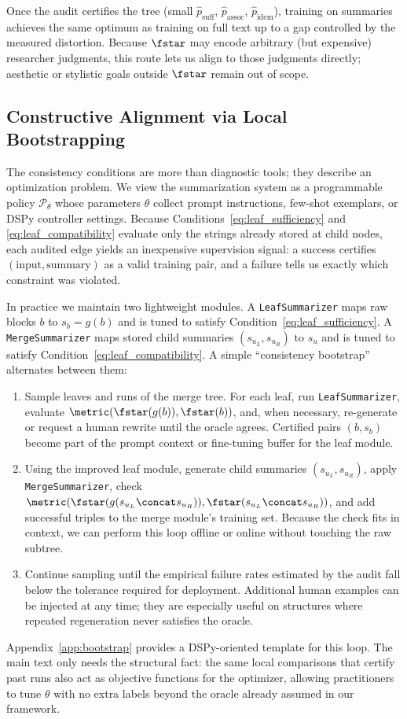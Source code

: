 Once the audit certifies the tree (small $\hat{p}_{\text{suff}}$, $\hat{p}_{\text{assoc}}$, $\hat{p}_{\text{idem}}$), training on summaries achieves the same optimum as training on full text up to a gap controlled by the measured distortion. Because $\fstar$ may encode arbitrary (but expensive) researcher judgments, this route lets us align to those judgments directly; aesthetic or stylistic goals outside $\fstar$ remain out of scope.

\subsection{Constructive Alignment via Local Bootstrapping}\label{sec:bootstrap-main}

The consistency conditions are more than diagnostic tools; they describe an optimization problem. We view the summarization system as a programmable policy $\mathcal{P}_\theta$ whose parameters $\theta$ collect prompt instructions, few-shot exemplars, or DSPy controller settings. Because Conditions~\eqref{eq:leaf_sufficiency} and \eqref{eq:leaf_compatibility} evaluate only the strings already stored at child nodes, each audited edge yields an inexpensive supervision signal: a success certifies $(\text{input}, \text{summary})$ as a valid training pair, and a failure tells us exactly which constraint was violated.

In practice we maintain two lightweight modules. A \texttt{LeafSummarizer} maps raw blocks $b$ to $s_b = g(b)$ and is tuned to satisfy Condition~\eqref{eq:leaf_sufficiency}. A \texttt{MergeSummarizer} maps stored child summaries $(s_{u_L}, s_{u_R})$ to $s_u$ and is tuned to satisfy Condition~\eqref{eq:leaf_compatibility}. A simple ``consistency bootstrap'' alternates between them:
\begin{enumerate}[label=\roman*.]
    \item Sample leaves and runs of the merge tree. For each leaf, run \texttt{LeafSummarizer}, evaluate $\metric(\fstar(g(b)), \fstar(b))$, and, when necessary, re-generate or request a human rewrite until the oracle agrees. Certified pairs $(b, s_b)$ become part of the prompt context or fine-tuning buffer for the leaf module.
    \item Using the improved leaf module, generate child summaries $(s_{u_L}, s_{u_R})$, apply \texttt{MergeSummarizer}, check $\metric(\fstar(g(s_{u_L} \concat s_{u_R})), \fstar(s_{u_L} \concat s_{u_R}))$, and add successful triples to the merge module's training set. Because the check fits in context, we can perform this loop offline or online without touching the raw subtree.
    \item Continue sampling until the empirical failure rates estimated by the audit fall below the tolerance required for deployment. Additional human examples can be injected at any time; they are especially useful on structures where repeated regeneration never satisfies the oracle.
\end{enumerate}
Appendix~\ref{app:bootstrap} provides a DSPy-oriented template for this loop. The main text only needs the structural fact: the same local comparisons that certify past runs also act as objective functions for the optimizer, allowing practitioners to tune $\theta$ with no extra labels beyond the oracle already assumed in our framework.
